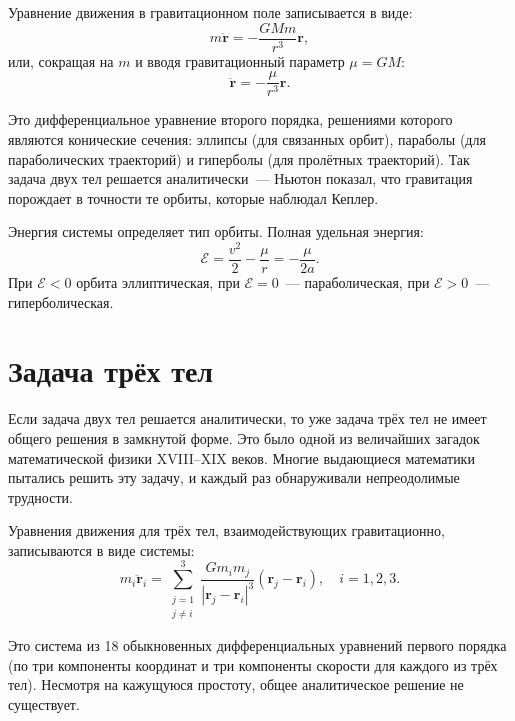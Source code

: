 \documentclass[12pt,a4paper]{article}
\begin{document}
Уравнение движения в гравитационном поле записывается в виде:
\begin{equation}
  m \ddot{\mathbf{r}} = -\frac{G M m}{r^3} \mathbf{r},
\end{equation}
или, сокращая на $m$ и вводя гравитационный параметр $\mu = GM$:
\begin{equation}
  \ddot{\mathbf{r}} = -\frac{\mu}{r^3} \mathbf{r}.
\end{equation}

Это дифференциальное уравнение второго порядка, решениями которого являются
конические сечения: эллипсы (для связанных орбит), параболы (для
параболических траекторий) и гиперболы (для пролётных траекторий). Так
задача двух тел решается аналитически~--- Ньютон показал, что гравитация
порождает в точности те орбиты, которые наблюдал Кеплер.

Энергия системы определяет тип орбиты. Полная удельная энергия:
\begin{equation}
  \mathcal{E} = \frac{v^2}{2} - \frac{\mu}{r} = -\frac{\mu}{2a}.
\end{equation}
При $\mathcal{E} < 0$ орбита эллиптическая, при $\mathcal{E} = 0$~---
параболическая, при $\mathcal{E} > 0$~--- гиперболическая.

\section{Задача трёх тел}

Если задача двух тел решается аналитически, то уже задача трёх тел не
имеет общего решения в замкнутой форме. Это было одной из величайших
загадок математической физики XVIII--XIX веков. Многие выдающиеся математики
пытались решить эту задачу, и каждый раз обнаруживали непреодолимые
трудности.

Уравнения движения для трёх тел, взаимодействующих гравитационно,
записываются в виде системы:
\begin{equation}
  m_i \ddot{\mathbf{r}}_i = \sum_{\substack{j=1 \\ j \neq i}}^{3}
  \frac{G m_i m_j}{|\mathbf{r}_j - \mathbf{r}_i|^3}
  (\mathbf{r}_j - \mathbf{r}_i), \quad i = 1, 2, 3.
\end{equation}

Это система из 18 обыкновенных дифференциальных уравнений первого порядка
(по три компоненты координат и три компоненты скорости для каждого из трёх
тел). Несмотря на кажущуюся простоту, общее аналитическое решение не
существует.
\end{document}
